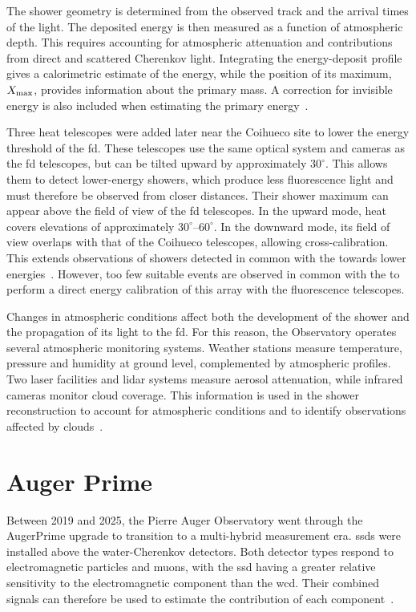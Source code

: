\documentclass[main.tex]{subfiles}
\begin{document}
The shower geometry is determined from the observed track and the arrival times of the light.
The deposited energy is then measured as a function of atmospheric depth.
This requires accounting for atmospheric attenuation and contributions from direct and scattered Cherenkov light.
Integrating the energy-deposit profile gives a calorimetric estimate of the energy, while the position of its maximum, $X_\mathrm{max}$, provides information about the primary mass.
A correction for invisible energy is also included when estimating the primary energy~\cite{PierreAuger:2015:Observatory}.

Three \gls{heat} telescopes were added later near the Coihueco site to lower the energy threshold of the \gls{fd}.
These telescopes use the same optical system and cameras as the \gls{fd} telescopes, but can be tilted upward by approximately $30^\circ$.
This allows them to detect lower-energy showers, which produce less fluorescence light and must therefore be observed from closer distances.
Their shower maximum can appear above the field of view of the \gls{fd} telescopes.
In the upward mode, \gls{heat} covers elevations of approximately $30^\circ$--$60^\circ$.
In the downward mode, its field of view overlaps with that of the Coihueco telescopes, allowing cross-calibration.
This extends observations of showers detected in common with the  towards lower energies~\cite{PierreAuger:2015:Observatory}.
However, too few suitable events are observed in common with the  to perform a direct energy calibration of this array with the fluorescence telescopes.

Changes in atmospheric conditions affect both the development of the shower and the propagation of its light to the \gls{fd}.
For this reason, the Observatory operates several atmospheric monitoring systems.
Weather stations measure temperature, pressure and humidity at ground level, complemented by atmospheric profiles.
Two laser facilities and lidar systems measure aerosol attenuation, while infrared cameras monitor cloud coverage.
This information is used in the shower reconstruction to account for atmospheric conditions and to identify observations affected by clouds~\cite{PierreAuger:2015:Observatory}.

\section{Auger Prime}
\label{sec:auger_prime}
Between 2019 and 2025, the Pierre Auger Observatory went through the AugerPrime upgrade to transition to a multi-hybrid measurement era.
\Glspl{ssd} were installed above the water-Cherenkov detectors.
Both detector types respond to electromagnetic particles and muons, with the \gls{ssd} having a greater relative sensitivity to the electromagnetic component than the \gls{wcd}.
Their combined signals can therefore be used to estimate the contribution of each component~\cite{PierreAuger:AugerPrime}.
\end{document}
